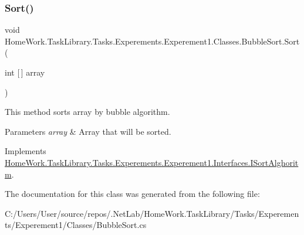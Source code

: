 \subsubsection{\texorpdfstring{Sort()}{Sort()}}
{\footnotesize\ttfamily void Home\+Work.\+Task\+Library.\+Tasks.\+Experements.\+Experement1.\+Classes.\+Bubble\+Sort.\+Sort (\begin{DoxyParamCaption}\item[{int \mbox{[}$\,$\mbox{]}}]{array }\end{DoxyParamCaption})}



This method sorts array by bubble algorithm. 


\begin{DoxyParams}{Parameters}
{\em array} & Array that will be sorted.\\
\hline
\end{DoxyParams}


Implements \mbox{\hyperlink{interface_home_work_1_1_task_library_1_1_tasks_1_1_experements_1_1_experement1_1_1_interfaces_1_1_i_sort_alghoritm}{Home\+Work.\+Task\+Library.\+Tasks.\+Experements.\+Experement1.\+Interfaces.\+I\+Sort\+Alghoritm}}.



The documentation for this class was generated from the following file\+:\begin{DoxyCompactItemize}
\item 
C\+:/\+Users/\+User/source/repos/.\+Net\+Lab/\+Home\+Work.\+Task\+Library/\+Tasks/\+Experements/\+Experement1/\+Classes/Bubble\+Sort.\+cs\end{DoxyCompactItemize}
